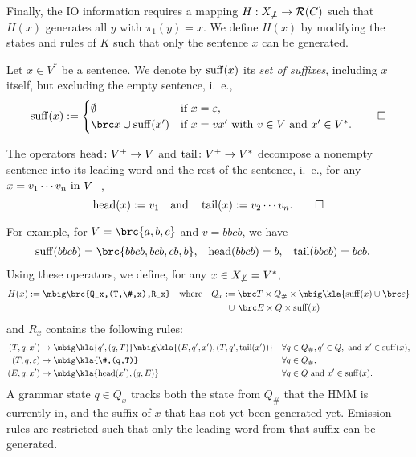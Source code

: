 Finally, the IO information requires a mapping $H: X_{\not\bot}\to\mathcal R(C)$ such
that $H(x)$ generates all $y$ with $\pi_1(y)=x$. We define $H(x)$ by
modifying the states and rules of $K$ such that only the sentence $x$ can be
generated.

\begin{definition}
 Let $x\in V^*$ be a sentence. We denote by $\operatorname{suff}(x)$ its
 \emph{set of suffixes}, including $x$ itself, but excluding the empty sentence, i.~e.,
 \[
  \suff(x) := \begin{cases}
   \emptyset & \text{if } x = \eps, \\
   \brc x \cup \suff(x') & \text{if } x = vx' \text{ with } v\in V\text{ and }x'\in V^*.
  \end{cases}\qedhere
 \]
\end{definition}

\begin{definition}
 The operators $\operatorname{head}\colon V^+\to V$ and $\operatorname{tail}\colon V^+\to V^*$ decompose a nonempty sentence into its leading word and the rest of the sentence, i.~e., for any $x = v_1\cdots v_n\text{ in } V^+$,
 \[
  \operatorname{head}(x) := v_1
  \quad\text{and}\quad
  \operatorname{tail}(x) := v_2\cdots v_n.
  \qedhere
 \]
\end{definition}

For example, for $V = \brc{a,b,c}$ and $v = bbcb$, we have
\begin{align*}
 \suff(bbcb) &= \brc{bbcb, bcb, cb, b}, &
 \car(bbcb) &= b, &
 \cdr(bbcb) &= bcb.
\end{align*}
Using these operators, we define, for any $x\in X_{\not\bot} = V^*$,
\begin{align*}
 H(x) := \mbig\brc{Q_x,(T,\#,x),R_x} \quad\text{where}\quad
 Q_x &:= \brc T \times Q_\# \times \mbig\kla{\suff(x)\cup\brc\eps} \\
 &\hspace{0.40em}\cup\hspace{0.15em} \brc E \times Q \times \suff(x)
\end{align*}
and $R_x$ contains the following rules:
\label{eq:03-R_x}\begin{align*}
 (T,q,x') &\to \mbig\kla{q',(q,T)}\mbig\kla{(E,q',x'),(T,q',\cdr(x'))} && \forall q\in Q_\#,q'\in Q,\text{ and }x'\in\suff(x), \\
 (T,q,\eps) &\to \mbig\kla{\#,(q,T)} && \forall q\in Q_\#, \\
 (E,q,x') &\to \mbig\kla{\car(x'),(q,E)} && \forall q\in Q\text{ and }x'\in\suff(x).
\end{align*}
%
A grammar state $q\in Q_x$ tracks both the state from $Q_\#$ that the HMM is
currently in, and the suffix of $x$ that has not yet been generated yet. Emission
rules are restricted such that only the leading word from that suffix can be generated.

